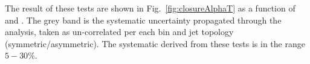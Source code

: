 The result of these tests are shown in Fig.~\ref{fig:closureAlphaT} as a function of \scalht and \njet. 
The grey band is the systematic uncertainty propagated through the analysis, 
taken as un-correlated per each \scalht bin and jet topology
(symmetric/asymmetric). The systematic derived from these tests is
in the range $5-30\%$.


\begin{figure}[h!]
  \begin{center}
    ~~
    \\
    ~~


\end{center}
\end{figure}
